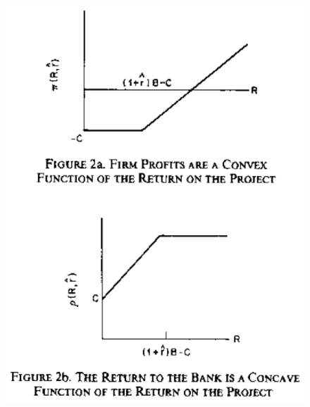 \documentclass{beamer}
\begin{document}
\begin{frame}
  \begin{figure}
    \includegraphics{stiglitz_weiss2.eps}
  \end{figure}
\end{frame}
\end{document}
